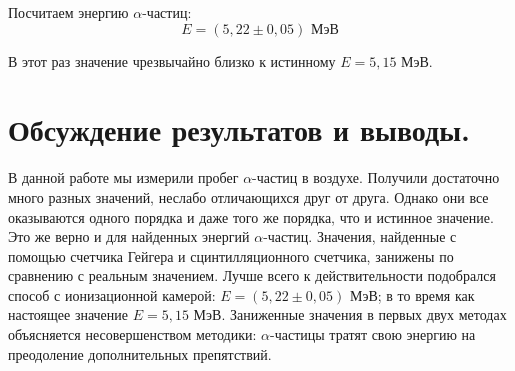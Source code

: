 \documentclass{article}
\begin{document}
\begin{enumerate}
		Посчитаем энергию $\alpha$-частиц:
		\begin{equation*}
			\boxed{E = (5,22 \pm 0,05) \text{ МэВ}}
		\end{equation*}
	
		В этот раз значение чрезвычайно близко к истинному $E = 5,15$ МэВ.
	
	\end{enumerate}

	\newpage
\section{Обсуждение результатов и выводы.}
	
	\begin{table}[h!]
		\centering
	\end{table}
	
	В данной работе мы измерили пробег $\alpha$-частиц в воздухе. Получили достаточно много разных значений, неслабо отличающихся друг от друга. Однако они все оказываются одного порядка и даже того же порядка, что и истинное значение. Это же верно и для найденных энергий $\alpha$-частиц. Значения, найденные с помощью счетчика Гейгера и сцинтилляционного счетчика, занижены по сравнению с реальным значением. Лучше всего к действительности подобрался способ с ионизационной камерой: $E = (5,22 \pm 0,05)$ МэВ; в то время как настоящее значение $E = 5,15$ МэВ. Заниженные значения в первых двух методах объясняется несовершенством методики: $\alpha$-частицы тратят свою энергию на преодоление дополнительных препятствий. 
	
	
	
\end{document}
